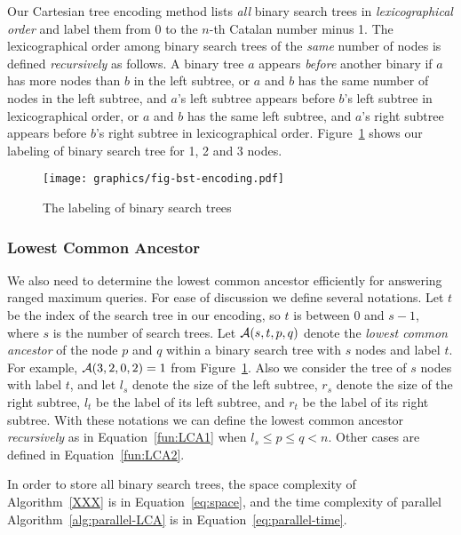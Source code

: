 Our Cartesian tree encoding method lists {\em all} binary search trees
in {\em lexicographical order} and label them from $0$ to the $n$-th
Catalan number minus 1.  The lexicographical order among binary search
trees of the {\em same} number of nodes is defined {\em recursively}
as follows.  A binary tree $a$ appears {\em before} another binary if
$a$ has more nodes than $b$ in the left subtree, or $a$ and $b$ has
the same number of nodes in the left subtree, and $a$'s left subtree
appears before $b$'s left subtree in lexicographical order, or $a$ and
$b$ has the same left subtree, and $a$'s right subtree appears before
$b$'s right subtree in lexicographical order.
Figure~\ref{fig:labelingBST} shows our labeling of binary search tree
for 1, 2 and 3 nodes.

\begin{figure}[!thb]
  \centering
  \texttt{[image: graphics/fig-bst-encoding.pdf]}
  \caption{The labeling of binary search trees}
  \label{fig:labelingBST}
\end{figure}

\subsubsection{Lowest Common Ancestor}

We also need to determine the lowest common ancestor efficiently for
answering ranged maximum queries.  For ease of discussion we define
several notations.  Let $t$ be the index of the search tree in our
encoding, so $t$ is between 0 and $s - 1$, where $s$ is the number of
search trees.  Let ${\cal A}(s, t, p, q)$ denote the {\em lowest
  common ancestor} of the node $p$ and $q$ within a binary search tree
with $s$ nodes and label $t$.  For example, ${\cal A}(3, 2, 0, 2) = 1$
from Figure~\ref{fig:labelingBST}.  Also we consider the tree of $s$
nodes with label $t$, and let $l_s$ denote the size of the left
subtree, $r_s$ denote the size of the right subtree, $l_t$ be the
label of its left subtree, and $r_t$ be the label of its right
subtree.  With these notations we can define the lowest common
ancestor {\em recursively} as in Equation~\ref{fun:LCA1} when $l_s
\le p \le q < n$.  Other cases are defined in Equation~\ref{fun:LCA2}.



In order to store all binary search trees, the space complexity of
Algorithm~\ref{XXX} is in Equation~\ref{eq:space}, and the time
complexity of parallel Algorithm~\ref{alg:parallel-LCA} is in
Equation~\ref{eq:parallel-time}.


